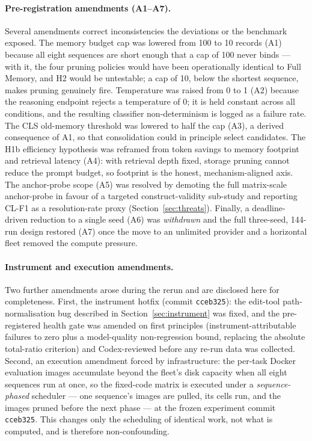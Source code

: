 \paragraph{Pre-registration amendments (A1--A7).}
Several amendments correct inconsistencies the deviations or the benchmark exposed. The
memory budget cap was lowered from 100 to 10 records (A1) because all eight sequences are
short enough that a cap of 100 never binds --- with it, the four pruning policies would have
been operationally identical to Full Memory, and H2 would be untestable; a cap of 10, below
the shortest sequence, makes pruning genuinely fire. Temperature was raised from 0 to 1 (A2)
because the reasoning endpoint rejects a temperature of 0; it is held constant across all
conditions, and the resulting classifier non-determinism is logged as a failure rate. The
CLS old-memory threshold was lowered to half the cap (A3), a derived consequence of A1, so
that consolidation could in principle select candidates. The H1b efficiency hypothesis was
reframed from token savings to memory footprint and retrieval latency (A4): with retrieval
depth fixed, storage pruning cannot reduce the prompt budget, so footprint is the honest,
mechanism-aligned axis. The anchor-probe scope (A5) was resolved by demoting the full
matrix-scale anchor-probe in favour of a targeted construct-validity sub-study and reporting
CL-F1 as a resolution-rate proxy (Section~\ref{sec:threats}). Finally, a deadline-driven
reduction to a single seed (A6) was \emph{withdrawn} and the full three-seed, 144-run design
restored (A7) once the move to an unlimited provider and a horizontal fleet removed the
compute pressure.

\paragraph{Instrument and execution amendments.}
Two further amendments arose during the rerun and are disclosed here for completeness. First,
the instrument hotfix (commit \texttt{cceb325}): the edit-tool path-normalisation bug
described in Section~\ref{sec:instrument} was fixed, and the pre-registered health gate was
amended on first principles (instrument-attributable failures to zero plus a model-quality
non-regression bound, replacing the absolute total-ratio criterion) and Codex-reviewed before
any re-run data was collected. Second, an execution amendment forced by infrastructure: the
per-task Docker evaluation images accumulate beyond the fleet's disk capacity when all eight
sequences run at once, so the fixed-code matrix is executed under a \emph{sequence-phased}
scheduler --- one sequence's images are pulled, its cells run, and the images pruned before
the next phase --- at the frozen experiment commit \texttt{cceb325}. This changes only the
scheduling of identical work, not what is computed, and is therefore non-confounding.


